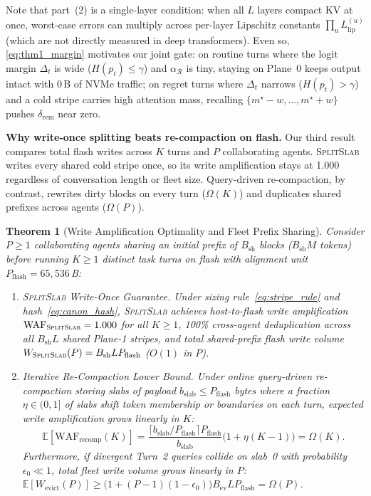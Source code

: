 \documentclass[pdflatex,sn-mathphys-num]{sn-jnl}
\theoremstyle{thmstyleone}
\newtheorem{theorem}{Theorem}
\newcommand{\SplitSlab}{\textsc{SplitSlab}}
\newcommand{\WAF}{\mathrm{WAF}}
\newcommand{\E}{\mathbb{E}}
\begin{document}
Note that part~(2) is a single-layer condition: when all $L$ layers compact KV at once, worst-case errors can multiply across per-layer Lipschitz constants $\prod_u L_{\mathrm{lip}}^{(u)}$ (which are not directly measured in deep transformers). Even so, \eqref{eq:thm1_margin} motivates our joint gate: on routine turns where the logit margin $\Delta_t$ is wide ($H(p_t) \le \gamma$) and $\alpha_{\mathcal{R}}$ is tiny, staying on Plane~0 keeps output intact with 0\,B of NVMe traffic; on regret turns where $\Delta_t$ narrows ($H(p_t) > \gamma$) and a cold stripe carries high attention mass, recalling $\{m^\star - w, \dots, m^\star + w\}$ pushes $\delta_{\mathrm{rem}}$ near zero.

\textbf{Why write-once splitting beats re-compaction on flash.} Our third result compares total flash writes across $K$ turns and $P$ collaborating agents. \SplitSlab{} writes every shared cold stripe once, so its write amplification stays at 1.000 regardless of conversation length or fleet size. Query-driven re-compaction, by contrast, rewrites dirty blocks on every turn ($\Omega(K)$) and duplicates shared prefixes across agents ($\Omega(P)$).

\begin{theorem}[Write Amplification Optimality and Fleet Prefix Sharing]\label{thm:waf}
Consider $P \ge 1$ collaborating agents sharing an initial prefix of $B_{\mathrm{sh}}$ blocks ($B_{\mathrm{sh}} M$ tokens) before running $K \ge 1$ distinct task turns on flash with alignment unit $P_{\mathrm{flash}} = 65{,}536$\,B:
\begin{enumerate}
  \item \emph{\SplitSlab{} Write-Once Guarantee.} Under sizing rule~\eqref{eq:stripe_rule} and hash~\eqref{eq:canon_hash}, \SplitSlab{} achieves host-to-flash write amplification $\WAF_{\SplitSlab} = 1.000$ for all $K \ge 1$, 100\% cross-agent deduplication across all $B_{\mathrm{sh}} L$ shared Plane-1 stripes, and total shared-prefix flash write volume $W_{\SplitSlab}(P) = B_{\mathrm{sh}} L P_{\mathrm{flash}}$ ($O(1)$ in $P$).
  \item \emph{Iterative Re-Compaction Lower Bound.} Under online query-driven re-compaction storing slabs of payload $b_{\mathrm{slab}} \le P_{\mathrm{flash}}$ bytes where a fraction $\eta \in (0, 1]$ of slabs shift token membership or boundaries on each turn, expected write amplification grows linearly in $K$:
  \begin{equation}\label{eq:thm2_waf}
  \E[\WAF_{\mathrm{recomp}}(K)] = \frac{\lceil b_{\mathrm{slab}} / P_{\mathrm{flash}} \rceil P_{\mathrm{flash}}}{b_{\mathrm{slab}}}\big(1 + \eta(K - 1)\big) = \Omega(K).
  \end{equation}
  Furthermore, if divergent Turn~2 queries collide on slab~0 with probability $\epsilon_0 \ll 1$, total fleet write volume grows linearly in $P$: $\E[W_{\mathrm{evict}}(P)] \ge \big(1 + (P - 1)(1 - \epsilon_0)\big) B_{\mathrm{ev}} L P_{\mathrm{flash}} = \Omega(P)$.
\end{enumerate}
\end{theorem}
\end{document}
